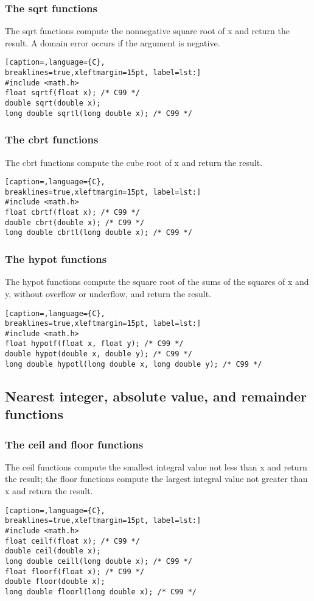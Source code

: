 \subsubsection{The sqrt functions}
The sqrt functions compute the nonnegative square root of x and return the
result. A domain error occurs if the argument is negative.
\lstset{basicstyle=\scriptsize, numbers=left, captionpos=b, tabsize=4}
\begin{lstlisting}[caption=,language={C},
breaklines=true,xleftmargin=15pt, label=lst:]
#include <math.h>
float sqrtf(float x); /* C99 */
double sqrt(double x);
long double sqrtl(long double x); /* C99 */
\end{lstlisting}

\subsubsection{The cbrt functions}
The cbrt functions compute the cube root of x and return the result.
\lstset{basicstyle=\scriptsize, numbers=left, captionpos=b, tabsize=4}
\begin{lstlisting}[caption=,language={C},
breaklines=true,xleftmargin=15pt, label=lst:]
#include <math.h>
float cbrtf(float x); /* C99 */
double cbrt(double x); /* C99 */
long double cbrtl(long double x); /* C99 */
\end{lstlisting}

\subsubsection{The hypot functions}
The hypot functions compute the square root of the sums of the squares of x and
y, without overflow or underflow, and return the result.
\lstset{basicstyle=\scriptsize, numbers=left, captionpos=b, tabsize=4}
\begin{lstlisting}[caption=,language={C},
breaklines=true,xleftmargin=15pt, label=lst:]
#include <math.h>
float hypotf(float x, float y); /* C99 */
double hypot(double x, double y); /* C99 */
long double hypotl(long double x, long double y); /* C99 */
\end{lstlisting}

\subsection{Nearest integer, absolute value, and remainder functions}
\subsubsection{The ceil and floor functions}
The ceil functions compute the smallest integral value not less than x and
return the result; the floor functions compute the largest integral value not
greater than x and return the result.
\lstset{basicstyle=\scriptsize, numbers=left, captionpos=b, tabsize=4}
\begin{lstlisting}[caption=,language={C},
breaklines=true,xleftmargin=15pt, label=lst:]
#include <math.h>
float ceilf(float x); /* C99 */
double ceil(double x);
long double ceill(long double x); /* C99 */
float floorf(float x); /* C99 */
double floor(double x);
long double floorl(long double x); /* C99 */
\end{lstlisting}

